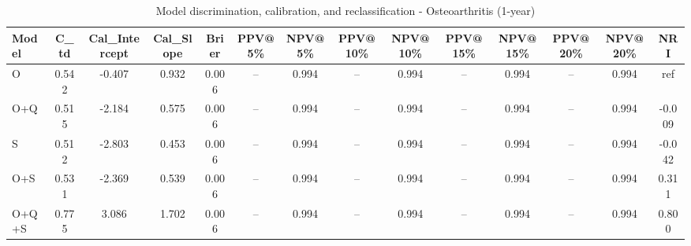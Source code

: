 \begin{table}[htbp]
\centering
\small
\caption{Model discrimination, calibration, and reclassification - Osteoarthritis (1-year)}
\label{tab:perf_osteoarthritis_1y}
\begin{tabular}{lccccccccccccc}
\toprule
Model & C\_td & Cal\_Intercept & Cal\_Slope & Brier & PPV@5\% & NPV@5\% & PPV@10\% & NPV@10\% & PPV@15\% & NPV@15\% & PPV@20\% & NPV@20\% & NRI \\
\midrule
O & 0.542 & -0.407 & 0.932 & 0.006 & -- & 0.994 & -- & 0.994 & -- & 0.994 & -- & 0.994 & ref \\
O+Q & 0.515 & -2.184 & 0.575 & 0.006 & -- & 0.994 & -- & 0.994 & -- & 0.994 & -- & 0.994 & -0.009 \\
S & 0.512 & -2.803 & 0.453 & 0.006 & -- & 0.994 & -- & 0.994 & -- & 0.994 & -- & 0.994 & -0.042 \\
O+S & 0.531 & -2.369 & 0.539 & 0.006 & -- & 0.994 & -- & 0.994 & -- & 0.994 & -- & 0.994 & 0.311 \\
O+Q+S & 0.775 & 3.086 & 1.702 & 0.006 & -- & 0.994 & -- & 0.994 & -- & 0.994 & -- & 0.994 & 0.800 \\
\bottomrule
\end{tabular}
\end{table}